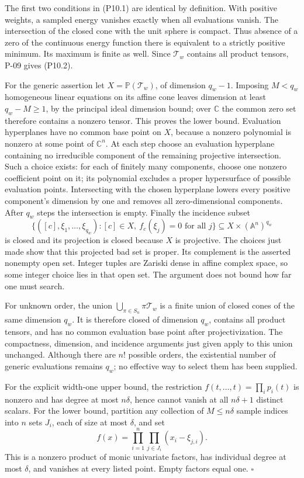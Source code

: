 \documentclass[11pt,a4paper]{article}
\theoremstyle{definition}\newtheorem{definition}{Definition}
\begin{document}
The first two conditions in (P10.1) are identical by definition. With positive weights, a sampled energy vanishes exactly when all evaluations vanish. The intersection of the closed cone with the unit sphere is compact. Thus absence of a zero of the continuous energy function there is equivalent to a strictly positive minimum. Its maximum is finite as well. Since $\mathcal T_w$ contains all product tensors, P-09 gives (P10.2).

For the generic assertion let $X=\mathbb P(\mathcal T_w)$, of dimension $q_w-1$. Imposing $M<q_w$ homogeneous linear equations on its affine cone leaves dimension at least $q_w-M\ge1$, by the principal ideal dimension bound; over $\mathbb C$ the common zero set therefore contains a nonzero tensor. This proves the lower bound. Evaluation hyperplanes have no common base point on $X$, because a nonzero polynomial is nonzero at some point of $\mathbb C^n$. At each step choose an evaluation hyperplane containing no irreducible component of the remaining projective intersection. Such a choice exists: for each of finitely many components, choose one nonzero coefficient point on it; its polynomial excludes a proper hypersurface of possible evaluation points. Intersecting with the chosen hyperplane lowers every positive component's dimension by one and removes all zero-dimensional components. After $q_w$ steps the intersection is empty. Finally the incidence subset
\[
 \{([c],\xi_1,\ldots,\xi_{q_w}):
      [c]\in X,\ f_c(\xi_j)=0\text{ for all }j\}
 \subseteq X\times(\mathbb A^n)^{q_w}
\]
is closed and its projection is closed because $X$ is projective. The choices just made show that this projected bad set is proper. Its complement is the asserted nonempty open set. Integer tuples are Zariski dense in affine complex space, so some integer choice lies in that open set. The argument does not bound how far one must search.

For unknown order, the union $\bigcup_{\pi\in S_n}\pi\mathcal T_w$ is a finite union of closed cones of the same dimension $q_w$. It is therefore closed of dimension $q_w$, contains all product tensors, and has no common evaluation base point after projectivization. The compactness, dimension, and incidence arguments just given apply to this union unchanged. Although there are $n!$ possible orders, the existential number of generic evaluations remains $q_w$; no effective way to select them has been supplied.

For the explicit width-one upper bound, the restriction
$f(t,\ldots,t)=\prod_i p_i(t)$ is nonzero and has degree at most $n\delta$, hence cannot vanish at all $n\delta+1$ distinct scalars. For the lower bound, partition any collection of $M\le n\delta$ sample indices into $n$ sets $J_i$, each of size at most $\delta$, and set
\[
 f(x)=\prod_{i=1}^n\prod_{j\in J_i}(x_i-\xi_{j,i}).
\]
This is a nonzero product of monic univariate factors, has individual degree at most $\delta$, and vanishes at every listed point. Empty factors equal one. $\square$
\end{document}
